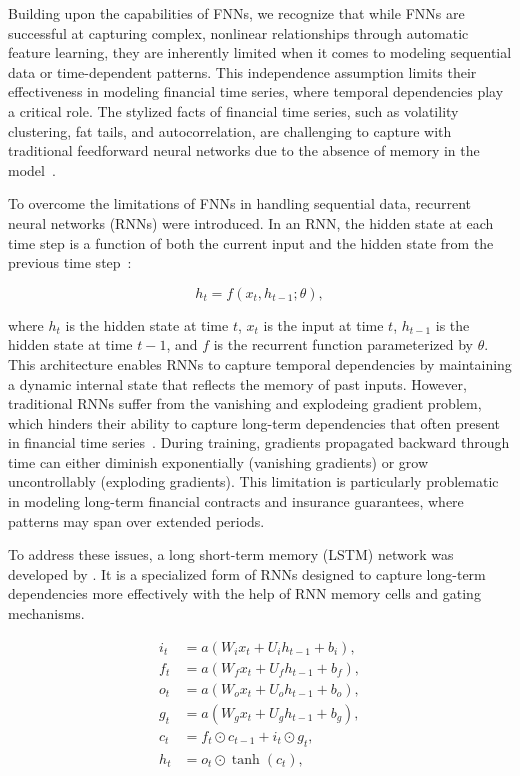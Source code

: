 Building upon the capabilities of FNNs, we recognize that while FNNs are successful at capturing complex, nonlinear relationships through automatic feature learning, they are inherently limited when it comes to modeling sequential data or time-dependent patterns. 
This independence assumption limits their effectiveness in modeling financial time series, where temporal dependencies play a critical role. 
The stylized facts of financial time series, such as volatility clustering, fat tails, and autocorrelation, are challenging to capture with traditional feedforward neural networks due to the absence of memory in the model~\citep{cont2001empirical}.

To overcome the limitations of FNNs in handling sequential data, recurrent neural networks (RNNs) were introduced.
In an RNN, the hidden state at each time step is a function of both the current input and the hidden state from the previous time step~\citep{elman1990finding}:

\begin{equation}
    h_t = f(x_t, h_{t-1}; \theta),
\end{equation}

where $h_t$ is the hidden state at time $t$, $x_t$ is the input at time $t$, $h_{t-1}$ is the hidden state at time $t-1$, and $f$ is the recurrent function parameterized by $\theta$.
This architecture enables RNNs to capture temporal dependencies by maintaining a dynamic internal state that reflects the memory of past inputs.
However, traditional RNNs suffer from the vanishing and explodeing gradient problem, which hinders their ability to capture long-term dependencies that often present in financial time series~\citep{bengio1994learning}.
During training, gradients propagated backward through time can either diminish exponentially (vanishing gradients) or grow uncontrollably (exploding gradients).
This limitation is particularly problematic in modeling long-term financial contracts and insurance guarantees, where patterns may span over extended periods.

To address these issues, a long short-term memory (LSTM) network was developed by \citet{hochreiter1997long}.
It is a specialized form of RNNs designed to capture long-term dependencies more effectively with the help of RNN memory cells and gating mechanisms.

\begin{align*}
    i_t &= a(W_i x_t + U_i h_{t-1} + b_i), \\
    f_t &= a(W_f x_t + U_f h_{t-1} + b_f), \\
    o_t &= a(W_o x_t + U_o h_{t-1} + b_o), \\
    g_t &= a(W_g x_t + U_g h_{t-1} + b_g), \\
    c_t &= f_t \odot c_{t-1} + i_t \odot g_t, \\
    h_t &= o_t \odot \tanh(c_t),
\end{align*}

